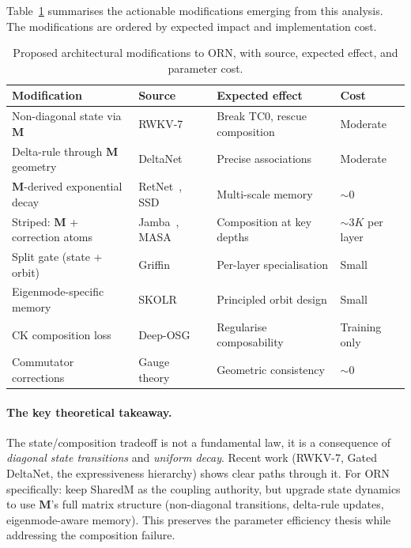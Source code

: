 \documentclass[11pt, a4paper]{article}
\newcommand{\M}{\mathbf{M}}
\theoremstyle{plain}
\theoremstyle{remark}
\begin{document}
Table~\ref{tab:arch-mods} summarises the actionable modifications emerging from this analysis.
The modifications are ordered by expected impact and implementation cost.

\begin{table}[h]
\centering
\caption{Proposed architectural modifications to ORN, with source, expected effect, and parameter cost.}\label{tab:arch-mods}
\small
\begin{tabular}{@{}llll@{}}
\toprule
\textbf{Modification} & \textbf{Source} & \textbf{Expected effect} & \textbf{Cost} \\
\midrule
Non-diagonal state via $\M$ & RWKV-7~\cite{peng2025rwkv7} & Break TC0, rescue composition & Moderate \\
Delta-rule through $\M$ geometry & DeltaNet~\cite{yang2025gated} & Precise associations & Moderate \\
$\M$-derived exponential decay & RetNet~\cite{sun2023retnet}, SSD~\cite{gu2024mamba2} & Multi-scale memory & $\sim 0$ \\
Striped: $\M$ + correction atoms & Jamba~\cite{lieber2024jamba}, MASA~\cite{ji2025masa} & Composition at key depths & ${\sim}3K$ per layer \\
Split gate (state + orbit) & Griffin~\cite{de2024griffin} & Per-layer specialisation & Small \\
Eigenmode-specific memory & SKOLR~\cite{nath2025skolr} & Principled orbit design & Small \\
CK composition loss & Deep-OSG~\cite{deeposg2023} & Regularise composability & Training only \\
Commutator corrections & Gauge theory~\cite{weiler2024gauge} & Geometric consistency & $\sim 0$ \\
\bottomrule
\end{tabular}
\end{table}

\paragraph{The key theoretical takeaway.}
The state/composition tradeoff is not a fundamental law, it is a consequence of \emph{diagonal state transitions} and \emph{uniform decay}.
Recent work (RWKV-7, Gated DeltaNet, the expressiveness hierarchy) shows clear paths through it.
For ORN specifically: keep SharedM as the coupling authority, but upgrade state dynamics to use $\M$'s full matrix structure (non-diagonal transitions, delta-rule updates, eigenmode-aware memory).
This preserves the parameter efficiency thesis while addressing the composition failure.
\end{document}
